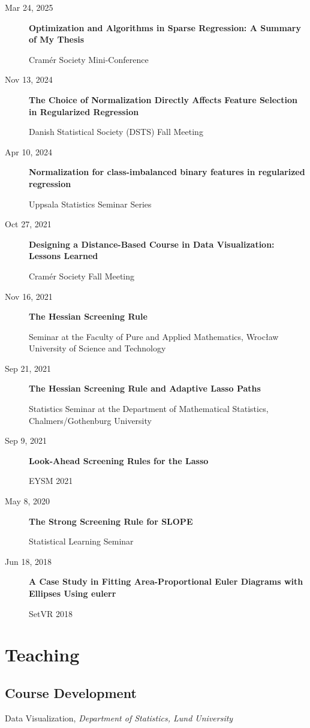 \documentclass[
  a4paper,
]{article}
\providecommand{\tightlist}{%
  \setlength{\itemsep}{0pt}\setlength{\parskip}{0pt}}
\begin{document}
\begin{description}
\item[Mar 24, 2025]
\textbf{Optimization and Algorithms in Sparse Regression: A Summary of
My Thesis}

Cramér Society Mini-Conference
\item[Nov 13, 2024]
\textbf{The Choice of Normalization Directly Affects Feature Selection
in Regularized Regression}

Danish Statistical Society (DSTS) Fall Meeting
\item[Apr 10, 2024]
\textbf{Normalization for class-imbalanced binary features in
regularized regression}

Uppsala Statistics Seminar Series
\item[Oct 27, 2021]
\textbf{Designing a Distance-Based Course in Data Visualization: Lessons
Learned}

Cramér Society Fall Meeting
\item[Nov 16, 2021]
\textbf{The Hessian Screening Rule}

Seminar at the Faculty of Pure and Applied Mathematics, Wrocław
University of Science and Technology
\item[Sep 21, 2021]
\textbf{The Hessian Screening Rule and Adaptive Lasso Paths}

Statistics Seminar at the Department of Mathematical Statistics,
Chalmers/Gothenburg University
\item[Sep 9, 2021]
\textbf{Look-Ahead Screening Rules for the Lasso}

EYSM 2021
\item[May 8, 2020]
\textbf{The Strong Screening Rule for SLOPE}

Statistical Learning Seminar
\item[Jun 18, 2018]
\textbf{A Case Study in Fitting Area-Proportional Euler Diagrams with
Ellipses Using eulerr}

SetVR 2018
\end{description}

\section{Teaching}\label{teaching}

\subsection{Course Development}\label{course-development}

\begin{description}
\tightlist
\item[2020--2023]
Data Visualization, \emph{Department of Statistics, Lund University}
\end{description}
\end{document}
